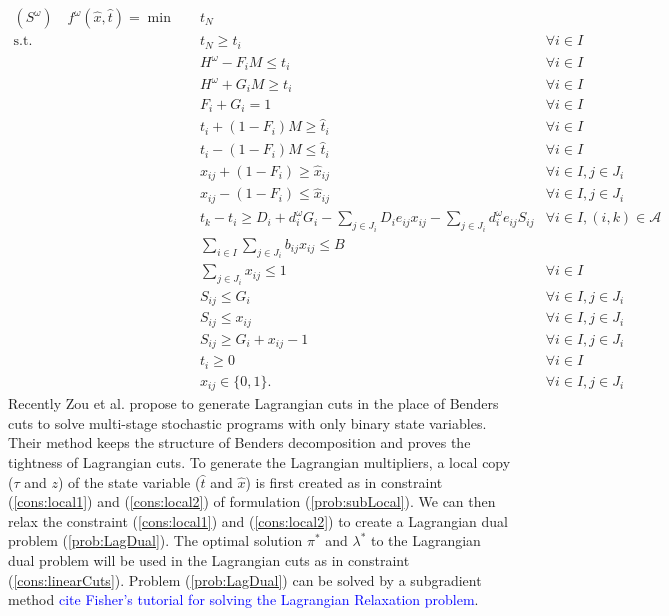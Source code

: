 \documentclass[11pt]{article}
\begin{document}
	\begin{subequations}
		\label{prob:sub}
		\begin{align}
			(S^\omega) \quad f^\omega(\hat{x},\hat{t}) = \min \quad & t_N & \\
			\text{s.t.} \quad & t_N \geq t_i & \forall i \in I \\
			& H^\omega - F_i M \leq t_i & \forall i \in I \\
			& H^\omega + G_i M \geq t_i & \forall i \in I \\
			& F_i + G_i = 1 & \forall i \in I \\
			& t_i + (1-F_i) M \geq \hat{t}_i & \forall i \in I\\
			& t_i - (1-F_i) M \leq \hat{t}_i & \forall i \in I \\
			& x_{ij} + (1-F_i) \geq \hat{x}_{ij} & \forall i \in I, j \in J_i \\
			& x_{ij} - (1-F_i) \leq \hat{x}_{ij} & \forall i \in I, j \in J_i \\
			& t_k - t_i \geq D_i + d_i^\omega G_i -\sum_{j \in J_i} D_i e_{ij} x_{ij} - \sum_{j \in J_i} d_i^\omega e_{ij} S_{ij} & \forall i \in I, (i,k) \in \mathcal{A}\\
			&\sum_{i \in I} \sum_{j \in J_i} b_{ij} x_{ij} \leq B &\\
			& \sum_{j \in J_i} x_{ij} \leq 1 & \forall i \in I\\
			& S_{ij} \leq G_i & \forall i \in I, j \in J_i \\
			& S_{ij} \leq x_{ij} & \forall i \in I, j \in J_i\\
			& S_{ij} \geq G_i + x_{ij} - 1 & \forall i \in I, j \in J_i\\
			& t_i \geq 0 & \forall i \in I \\
			& x_{ij} \in \{0,1\}. & \forall i \in I, j \in J_i
		\end{align}
	\end{subequations}
	Recently Zou et al. \cite{zou2016nested} propose to generate Lagrangian cuts in the place of Benders cuts to solve multi-stage stochastic programs with only binary state variables. Their method keeps the structure of Benders decomposition and proves the tightness of Lagrangian cuts. To generate the Lagrangian multipliers, a local copy (\(\tau\) and \(z\)) of the state variable (\(\hat{t}\) and \(\hat{x}\)) is first created as in constraint (\ref{cons:local1}) and (\ref{cons:local2}) of formulation (\ref{prob:subLocal}). We can then relax the constraint (\ref{cons:local1}) and (\ref{cons:local2}) to create a Lagrangian dual problem (\ref{prob:LagDual}). The optimal solution  \(\pi^*\) and \(\lambda^*\) to the Lagrangian dual problem will be used in the Lagrangian cuts as in constraint (\ref{cons:linearCuts}). Problem (\ref{prob:LagDual}) can be solved by a subgradient method \textcolor{blue}{cite Fisher's tutorial for solving the Lagrangian Relaxation problem}.\\
\end{document}
